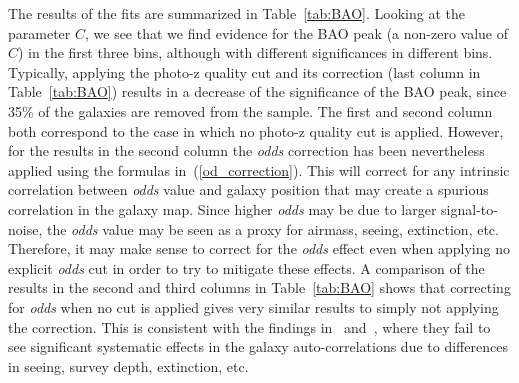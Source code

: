 The results of the fits are summarized in Table~\ref{tab:BAO}. Looking at the parameter $C$, we see that we find evidence for the BAO peak (a non-zero value of $C$) in the first three bins, although with different significances in different bins. Typically, applying the photo-z quality cut and its correction (last column in Table~\ref{tab:BAO}) results in a decrease of the significance of the BAO peak, since 35\% of the galaxies are removed from the sample. The first and second column both correspond to the case in which no photo-z quality cut is applied. However, for the results in the second column the {\it odds} correction has been nevertheless applied using the formulas 
in~(\ref{od_correction}). This will correct for any intrinsic correlation between {\it odds} value and galaxy position that may create a spurious correlation in the galaxy map. Since higher {\it odds} may be due to larger signal-to-noise, the {\it odds} value may be seen as a proxy for airmass, seeing, extinction, etc. 
Therefore, it may make sense to correct for the {\it odds} effect even when applying no explicit {\it odds} cut in order to try to mitigate these effects. A comparison of the results in the second and third columns in Table~\ref{tab:BAO} shows that correcting for \textit{odds} when no cut is applied gives very similar results to simply not applying the correction. 
This is consistent with the findings in~\citet{Ho2012} and~\citet{Ross2011}, where they fail to see significant systematic effects in the galaxy auto-correlations due to differences in seeing, survey depth, extinction, etc. 

